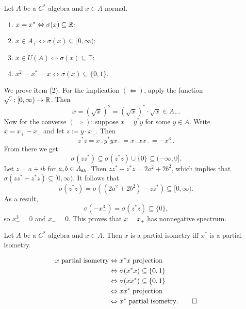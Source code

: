 \begin{theorem}
  Let $A$ be a $C^*$-algebra and $x \in A$ normal.
  \begin{enumerate}
    \item $x = x^* \Leftrightarrow \sigma(x) \subseteq \mathbb {R}$;
    \item $x \in A_+ \Leftrightarrow \sigma (x) \subseteq [0, \infty)$;
    \item $x \in U(A) \Leftrightarrow \sigma(x) \subseteq \mathbb{T}$;
    \item $x^2 = x^* = x \Leftrightarrow \sigma(x) \subseteq \{0, 1\}$.
  \end{enumerate}
\end{theorem}

\begin{myproof}
  We prove item (2). For the implication $(\Leftarrow)$, apply the function $\sqrt{\cdot}: [0, \infty) \to \mathbb {R}$.
  Then $$x = (\sqrt{x})^2 = (\sqrt{x})^* \cdot \sqrt{x} \in A_+.$$ Now for the converse $(\Rightarrow)$:
  suppose $x = y^* y$ for some $y \in A$. Write $x = x_+ - x_-$ and let $z := y \cdot x_-$.
  Then $$z^* z = x_- y^* y x_- = x_- x x_- = -x_-^3.$$
  From there we get 
  $$\sigma (z z^*) \subseteq \sigma(z^* z) \cup \{0\} \subseteq (-\infty, 0].$$
  Let $z = a + ib$ for $a, b \in A_{\operatorname{sa}}$. Then 
  $z z^* + z^* z = 2 a^2 + 2b^2$, which implies that $\sigma(z z^* + z^* z) \subseteq [0, \infty).$
  It follows that $$\sigma (z^* z) = \sigma((2 a^2 + 2b^2) - z z^*) \subseteq [0, \infty).$$
  As a result, $$\sigma(-x_-^3) = \sigma(z^* z) \subseteq \{0\},$$
  so $x_-^3 = 0$ and $x_- = 0$. This proves that $x = x_+$ has nonnegative spectrum.
\end{myproof}

\begin{corollary}
  Let $A$ be a $C^*$-algebra and $x \in A$. Then $x$ is a partial isometry iff $x^*$ is a partial isometry.
\end{corollary}

\begin{myproof}
  \begin{align*}
    \textrm{$x$ partial isometry} &\Leftrightarrow \textrm{$x^*x$ projection}\\
    &\Leftrightarrow {\sigma(x^* x) \subseteq \{0, 1\}}\\
    &\Leftrightarrow \sigma(x x^*) \subseteq \{0, 1\}\\
    &\Leftrightarrow \textrm{$xx^*$ projection}\\
    &\Leftrightarrow \textrm{$x^*$ partial isometry}. \qedhere
  \end{align*}
\end{myproof}

